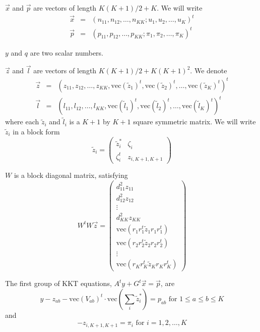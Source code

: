 \documentclass{article}
\newcommand*{\mvec}{\mathbf{\mathrm{vec}}}
\newcommand*{\mat}[1]{\tilde{#1}}
\begin{document}
$\vec{x}$ and $\vec{p}$ are vectors of length $K(K+1)/2 + K$. We will write 
\begin{eqnarray}
\vec{x} &=& ( n_{11}, n_{12}, \dots, n_{KK} ; u_1, u_2, \dots, u_K )^t
\nonumber \\
\vec{p} &=& ( p_{11}, p_{12}, \dots, p_{KK} ; \pi_1, \pi_2, \dots, \pi_K )^t
\end{eqnarray}

$y$ and $q$ are two scalar numbers.

$\vec{z}$ and $\vec{l}$ are vectors of length $K(K+1)/2 + K(K+1)^2$. We denote
\begin{eqnarray}
\vec{z} &=& ( z_{11}, z_{12}, \dots, z_{KK}, \mvec( \mat{z}_1)^t, \mvec( \mat{z}_2)^t, \dots, \mvec( \mat{z}_K)^t)^t
\nonumber \\
\vec{l} &=& ( l_{11}, l_{12}, \dots, l_{KK}, \mvec( \mat{l}_1)^t, \mvec( \mat{l}_2)^t, \dots, \mvec( \mat{l}_K)^t)^t
\end{eqnarray}
where each $\mat{z}_i$ and $\mat{l}_i$ is a $K+1$ by $K+1$ square
symmetric matrix.  We will write $\mat{z}_i$ in a block form
\begin{equation}
\mat{z}_i = \left( 
\begin{array}{cc}
\mat{z}_i^\ast & \zeta_i \\
\zeta_i^t & z_{i,K+1,K+1}
\end{array} \right)
\end{equation}

$W$ is a block diagonal matrix, satisfying
\begin{equation}
W^t W \vec{z} = \left(
\begin{array}{c}
d_{11}^2 z_{11} \\
d_{12}^2 z_{12} \\
\vdots \\
d_{KK}^2 z_{KK} \\
\mvec( r_1 r_1^t \mat{z}_1 r_1 r_1^t) \\
\mvec( r_2 r_2^t \mat{z}_2 r_2 r_2^t) \\
\vdots \\
\mvec( r_K r_K^t \mat{z}_K r_K r_K^t)
\end{array} \right)
\end{equation}

The first group of KKT equations, $A^t y + G^t \vec{x} = \vec{p}$, are
\begin{equation}
y - z_{ab} - \mvec(V_{ab})^t\cdot\mvec( \sum_i \mat{z}_i^\ast ) = p_{ab}
\text{ for } 1\leq a \leq b \leq K
\label{eq:KKT-1a}
\end{equation}
and
\begin{equation}
-z_{i,K+1,K+1} = \pi_i  \text{ for } i=1,2,\dots, K
\label{eq:KKT-1b}
\end{equation}
\end{document}
